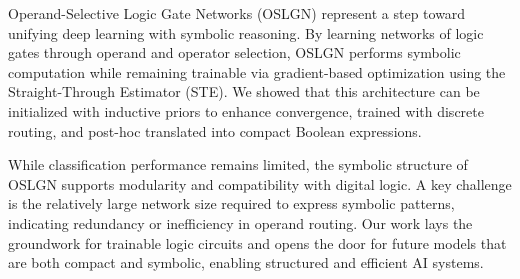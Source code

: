 Operand-Selective Logic Gate Networks (OSLGN) represent a step toward unifying deep learning with symbolic reasoning. By learning networks of logic gates through operand and operator selection, OSLGN performs symbolic computation while remaining trainable via gradient-based optimization using the Straight-Through Estimator (STE). We showed that this architecture can be initialized with inductive priors to enhance convergence, trained with discrete routing, and post-hoc translated into compact Boolean expressions.

While classification performance remains limited, the symbolic structure of OSLGN supports modularity and compatibility with digital logic. A key challenge is the relatively large network size required to express symbolic patterns, indicating redundancy or inefficiency in operand routing. Our work lays the groundwork for trainable logic circuits and opens the door for future models that are both compact and symbolic, enabling structured and efficient AI systems.
